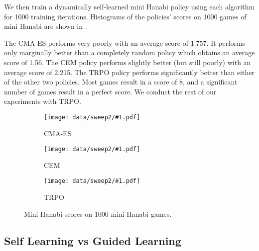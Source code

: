 We then train a dynamically self-learned mini Hanabi policy using each
algorithm for 1000 training iterations. Histograms of the policies' scores on
1000 games of mini Hanabi are shown in .

The CMA-ES performs very poorly with an average score of 1.757.  It performs
only marginally better than a completely random policy which obtains an average
score of 1.56.
%
The CEM policy performs slightly better (but still poorly) with an average
score of 2.215.
%
The TRPO policy performs significantly better than either of the other two
policies. Most games result in a score of 8, and a significant number of games
result in a perfect score.
%
We conduct the rest of our experiments with TRPO.

\begin{figure}[ht]
  \newcommand{\algosubfig}[3]{%
    \begin{subfigure}[b]{0.32\textwidth}
      \centering
      \texttt{[image: data/sweep2/\#1.pdf]}
      \caption{#2}\label{fig:#3}
    \end{subfigure}
  }

  \centering
  \algosubfig{CMA-ES}{CMA-ES}{cmaes}
  \algosubfig{CEM}{CEM}{cem}
  \algosubfig{TRPO}{TRPO}{trpo}
  \caption{Mini Hanabi scores on 1000 mini Hanabi games.}\label{fig:algos}
\end{figure}

\subsection{Self Learning vs Guided Learning}

